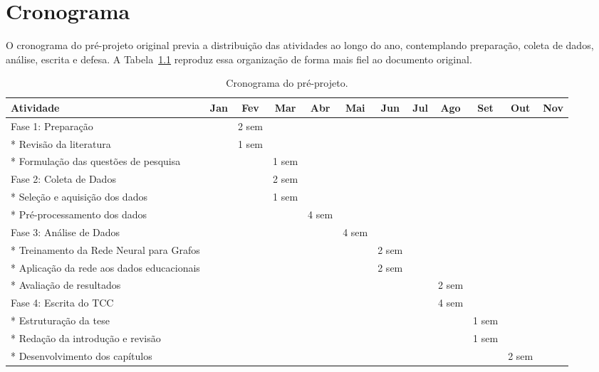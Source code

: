 \chapter{Cronograma}
\label{pre:cronograma}

O cronograma do pr\'e-projeto original previa a distribui\c{c}\~ao das atividades ao longo do ano, contemplando prepara\c{c}\~ao, coleta de dados, an\'alise, escrita e defesa. A Tabela~\ref{tab:cronograma-pre} reproduz essa organiza\c{c}\~ao de forma mais fiel ao documento original.

\pagebreak

\begin{table}[htbp]
\caption{Cronograma do pr\'e-projeto.}
\label{tab:cronograma-pre}
\centering
\tiny
\setlength{\tabcolsep}{3pt}
\begin{tabular}{|p{4.7cm}|c|c|c|c|c|c|c|c|c|c|c|}
\hline
\textbf{Atividade} & \textbf{Jan} & \textbf{Fev} & \textbf{Mar} & \textbf{Abr} & \textbf{Mai} & \textbf{Jun} & \textbf{Jul} & \textbf{Ago} & \textbf{Set} & \textbf{Out} & \textbf{Nov} \\
\hline
Fase 1: Prepara\c{c}\~ao & & 2 sem & & & & & & & & & \\
\hline
* Revis\~ao da literatura & & 1 sem & & & & & & & & & \\
\hline
* Formula\c{c}\~ao das quest\~oes de pesquisa & & & 1 sem & & & & & & & & \\
\hline
Fase 2: Coleta de Dados & & & 2 sem & & & & & & & & \\
\hline
* Sele\c{c}\~ao e aquisi\c{c}\~ao dos dados & & & 1 sem & & & & & & & & \\
\hline
* Pr\'e-processamento dos dados & & & & 4 sem & & & & & & & \\
\hline
Fase 3: An\'alise de Dados & & & & & 4 sem & & & & & & \\
\hline
* Treinamento da Rede Neural para Grafos & & & & & & 2 sem & & & & & \\
\hline
* Aplica\c{c}\~ao da rede aos dados educacionais & & & & & & 2 sem & & & & & \\
\hline
* Avalia\c{c}\~ao de resultados & & & & & & & & 2 sem & & & \\
\hline
Fase 4: Escrita do TCC & & & & & & & & 4 sem & & & \\
\hline
* Estrutura\c{c}\~ao da tese & & & & & & & & & 1 sem & & \\
\hline
* Reda\c{c}\~ao da introdu\c{c}\~ao e revis\~ao & & & & & & & & & 1 sem & & \\
\hline
* Desenvolvimento dos cap\'itulos & & & & & & & & & & 2 sem & \\

\end{tabular}
\end{table}
